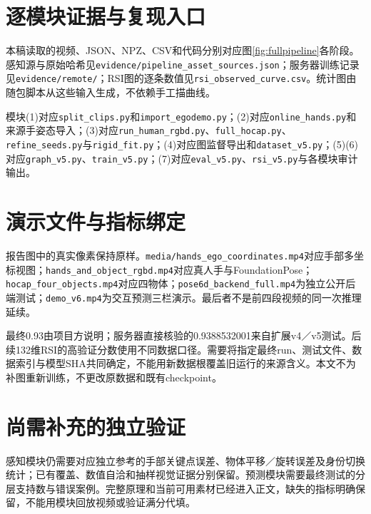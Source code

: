 \documentclass[10pt,twocolumn,letterpaper]{article}
\newcommand{\code}[1]{\texttt{\small #1}}
\begin{document}
\section{逐模块证据与复现入口}
本稿读取的视频、JSON、NPZ、CSV和代码分别对应图\ref{fig:fullpipeline}各阶段。感知源与原始哈希见\code{evidence/pipeline\_asset\_sources.json}；服务器训练记录见\code{evidence/remote/}；RSI图的逐条数值见\code{rsi\_observed\_curve.csv}。统计图由随包脚本从这些输入生成，不依赖手工描曲线。

模块(1)对应\code{split\_clips.py}和\code{import\_egodemo.py}；(2)对应\code{online\_hands.py}和来源手姿态导入；(3)对应\code{run\_human\_rgbd.py}、\code{full\_hocap.py}、\code{refine\_seeds.py}与\code{rigid\_fit.py}；(4)对应图监督导出和\code{dataset\_v5.py}；(5)(6)对应\code{graph\_v5.py}、\code{train\_v5.py}；(7)对应\code{eval\_v5.py}、\code{rsi\_v5.py}与各模块审计输出。

\section{演示文件与指标绑定}
\label{sec:assets}
报告图中的真实像素保持原样。\code{media/hands\_ego\_coordinates.mp4}对应手部多坐标视图；\code{hands\_and\_object\_rgbd.mp4}对应真人手与FoundationPose；\code{hocap\_four\_objects.mp4}对应四物体；\code{pose6d\_backend\_full.mp4}为独立公开后端测试；\code{demo\_v6.mp4}为交互预测三栏演示。最后者不是前四段视频的同一次推理延续。

最终0.93由项目方说明；服务器直接核验的0.9388532001来自扩展v4／v5测试。后续132维RSI的高验证分数使用不同数据口径。需要将指定最终run、测试文件、数据索引与模型SHA共同确定，不能用新数据根覆盖旧运行的来源含义。本文不为补图重新训练，不更改原数据和既有checkpoint。

\section{尚需补充的独立验证}
感知模块仍需要对应独立参考的手部关键点误差、物体平移／旋转误差及身份切换统计；已有覆盖、数值自洽和抽样视觉证据分别保留。预测模块需要最终测试的分层支持数与错误案例。完整原理和当前可用素材已经进入正文，缺失的指标明确保留，不能用模块回放视频或验证满分代填。
\end{document}
